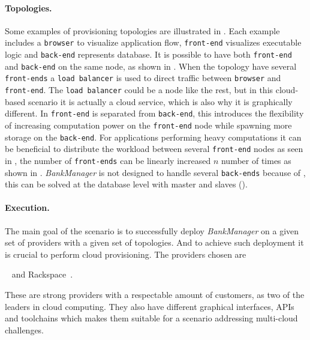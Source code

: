\paragraph{Topologies.}


Some examples of provisioning topologies are illustrated in .
Each example includes a \texttt{browser} to visualize application flow,
\texttt{front-end} visualizes executable logic and \texttt{back-end} represents database.
It is possible to have both \texttt{front-end} and \texttt{back-end} on the same node, 
as shown in .
When the topology have several \texttt{front-ends} a \texttt{load balancer} is used
to direct traffic between \texttt{browser} and \texttt{front-end}.
The \texttt{load balancer} could be a node like the rest, but in this cloud-based scenario
it is actually a cloud service, which is also why it is graphically different.
In  \texttt{front-end} is separated from \texttt{back-end},
this introduces the flexibility of increasing computation power on the \texttt{front-end} node while spawning more
storage on the \texttt{back-end}.
For applications performing heavy computations it can be beneficial to distribute the workload between several
\texttt{front-end} nodes as seen in , the number of \texttt{front-ends} can be linearly increased
$n$ number of times as shown in .
\emph{BankManager} is not designed to handle several \texttt{back-ends} because of ,
this can be solved at the database level with master and slaves ().

\paragraph{Execution.}

The main goal of the scenario is to successfully deploy \emph{BankManager}
on a given set of providers with a given set of topologies.
And to achieve such deployment it is crucial to perform cloud provisioning.
The providers chosen are
\begin{ii}
  \iitem {}~\cite{aws} and
  \iitem Rackspace~\cite{rackspace}.
\end{ii}
These are strong providers with a respectable amount of customers, as two of the leaders in cloud computing.
They also have different graphical interfaces, APIs and toolchains which makes them suitable
for a scenario addressing multi-cloud challenges.


